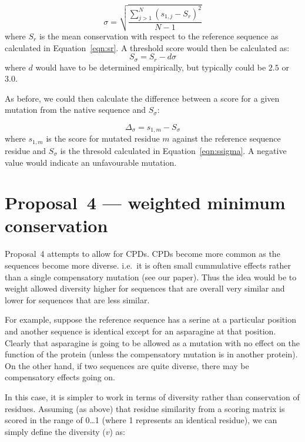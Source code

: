 \documentclass[a4paper]{article}
\begin{document}
\begin{equation}\label{eqn:sigma}
  \sigma = \sqrt{\frac{\sum_{j>1}^N(s_{1,j} - S_r)^2}{N-1}}
\end{equation}
where $S_r$ is the mean conservation with respect to the reference
sequence as calculated in Equation~\ref{eqn:sr}. A threshold score would
then be calculated as:
\begin{equation}\label{eqn:ssigma}
  S_\sigma = S_r - d\sigma
\end{equation}
where $d$ would have to be determined empirically, but typically could
be $2.5$ or $3.0$.

As before, we could then calculate the difference between a score for
a given mutation from the native sequence and $S_\sigma$:

\begin{equation}
  \Delta_\sigma = s_{1, m} - S_\sigma
\end{equation}
where $s_{1,m}$ is the score for mutated residue $m$ against the
reference sequence residue and $S_\sigma$ is the thresold calculated in
Equation~\ref{eqn:ssigma}. A negative value would indicate an unfavourable
mutation. 


\section{Proposal~4 --- weighted minimum conservation}
Proposal~4 attempts to allow for CPDs. CPDs become more common as the
sequences become more diverse. i.e.\ it is often small cummulative
effects rather than a single compensatory mutation (see our paper).
Thus the idea would be to weight allowed diversity higher for
sequences that are overall very similar and lower for sequences that
are less similar.

For example, suppose the reference sequence has a serine at a
particular position and another sequence is identical except for an
asparagine at that position. Clearly that asparagine is going to be
allowed as a mutation with no effect on the function of the protein
(unless the compensatory mutation is in another protein). On the other
hand, if two sequences are quite diverse, there may be compensatory
effects going on.

In this case, it is simpler to work in terms of diversity rather than
conservation of residues. Assuming (as above) that residue similarity
from a scoring matrix is scored in the range of 0\ldots 1 (where 1
represents an identical residue), we can simply define the diversity
($v$) as:
\end{document}
